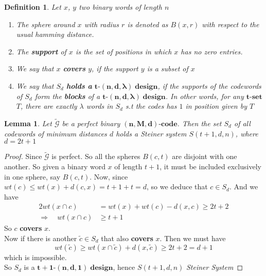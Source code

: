 \documentclass{article}
\newtheorem{lemma}[theorem]{Lemma}
\newtheorem{definition}[theorem]{Definition}
\numberwithin{equation}{theorem}
\numberwithin{figure}{theorem}
\newcommand{\tParamDesign}[4]{\ensuremath{\bm{#1\mbox{-}(#2,#3,#4)\; design}}}
\newcommand{\steinerSystem}[3]{\ensuremath{{S(#1,#2,#3)}}}
\newcommand{\pluralMyBlock}{\textbf{blocks}}
\newcommand{\cCodes}{\ensuremath{\widetilde{\mathscr{G}}}}
\newcommand{\tSet}[1]{\ensuremath{\bm{#1\mbox{-}{set}}}}
\newcommand{\code}[3]{\ensuremath{\bm{(#1,#2,#3)\mbox{-}code}}}
\begin{document}
\begin{definition}\label{coverSupportHoldDefinition}
	Let $x$, $y$ two binary words of length $n$
	\begin{enumerate}
		\item The sphere around $x$ with radius $r$ is denoted as $B(x,r)$ with respect to the usual hamming distance.
		\item The \textbf{support} of $x$ is the set of positions in which $x$ has no zero entries.
		\item We say that $x$ \textbf{covers} $y$, if the support $y$ is a subset of $x$
		\item We say that $S_d$ \textbf{holds a } {\tParamDesign{t}{n}{d}{\lambda}}, if the supports of the codewords of $S_d$ form the {\pluralMyBlock} of a {\tParamDesign{t}{n}{d}{\lambda}}. In other words, for any {\tSet{t}} $T$, there are exactly $\lambda$ words in $S_d$ s.t the codes has $1$ in position given by $T$
	\end{enumerate}
\end{definition}

\begin{lemma}\label{perfectCdDesign}
Let {\cCodes} be a perfect binary {\code{n}{M}{d}}. Then the set $S_d$ of all codewords of minimum distances $d$ holds a \emph{Steiner system} \steinerSystem{t+1}{d}{n}, where $d = 2t + 1$
\end{lemma}

\begin{proof}
Since {\cCodes} is perfect. So all the spheres $B(c,t)$ are disjoint with one another. So given a binary word $x$ of length $t+1$, it must be included exclusively in one sphere, say $B(c,t)$. Now, since $wt(c) \leq wt(x) + d(c,x) = t + 1 + t = d$, so we deduce that $c \in S_d$. And we have
\begin{align*}
	2wt(x \cap c) &= wt(x) + wt(c) - d(x,c) \geq 2t+2 \\
	\Rightarrow \quad wt(x\cap c) &\geq t + 1
\end{align*}
So $c$ \textbf{covers} $x$. \\
Now if there is another $\tilde{c} \in S_d$ that also \textbf{covers} $x$. Then we must have 
\[
	wt(\tilde{c}) \geq wt(x\cap \tilde{c}) + d(x,\tilde{c}) \geq 2t + 2 = d + 1
\]
 which is impossible. \\
So $S_d$ is a \tParamDesign{t+1}{n}{d}{1}, hence \steinerSystem{t+1}{d}{n} \emph{Steiner System}
\end{proof}
\end{document}

